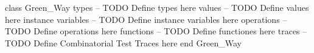 \begin{vdmpp}[breaklines=true]
class Green_Way
types
-- TODO Define types here
values
-- TODO Define values here
instance variables
-- TODO Define instance variables here
operations
-- TODO Define operations here
functions
-- TODO Define functiones here
traces
-- TODO Define Combinatorial Test Traces here
end Green_Way
\end{vdmpp}
